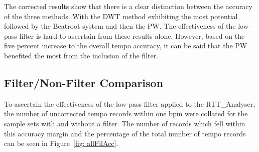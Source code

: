 \documentclass[a4paper, 11pt]{article}
\begin{document}
The corrected results show that there is a clear distinction between the accuracy of the three methods. With the DWT method exhibiting the most potential followed by the Beatroot system and then the PW. The effectiveness of the low-pass filter is hard to ascertain from these results alone. However, based on the five percent increase to the overall tempo accuracy, it can be said that the PW benefited the most from the inclusion of the filter.

\subsection{Filter/Non-Filter Comparison}
To ascertain the effectiveness of the low-pass filter applied to the RTT\_Analyser, the number of uncorrected tempo records within one bpm were collated for the sample sets with and without a filter. The number of records which fell within this accuracy margin and the percentage of the total number of tempo records can be seen in Figure~\ref{fig: allFilAcc}. 
\end{document}

